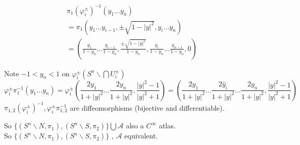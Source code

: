 \begin{enumerate}
\[
\begin{gathered}
\pi_1(\varphi_i^{\pm})^{-1}(y_1 \dots y_n) \\
  = \pi_1(y_1 \dots y_{i-1}, \pm \sqrt{ 1 - |y|^2 }, y_i \dots y_n) \\
  = \left( \frac{y_1 }{ 1 - y_n} \dots \frac{y_{i-1} }{ 1 - y_n}, \frac{ \pm \sqrt{ 1 - |y|^2 } }{ 1 - y_n } , \frac{y_i}{ 1 - y_n} \dots \frac{y_{n-1}}{ 1 - y_n }, 0 \right)
\end{gathered}
\]

Note $-1< y_n <1$ on $\varphi_i^{\pm}(S^n\backslash \bigcap U_i^{\pm})$
\[
\varphi_i^{\pm} \pi_1^{-1}(y_1 \dots y_n) = \varphi_i^{\pm}\left( \frac{ 2y_1}{ 1 + |y|^2} \dots \frac{2y_n}{ 1 + |y|^2} , \frac{|y|^2 - 1 }{ |y|^2 + 1 } \right) = \left( \frac{2y_1 }{ 1 + |y|^2} \dots \frac{ 2 \widehat{y}_i }{ 1 + |y|^2 } \dots \frac{ 2y_n }{ 1 + |y|^2 }, \frac{|y|^2 -1}{ |y|^2 + 1 } \right)
\]
$\pi_{1,2}(\varphi_i^{\pm})^{-1}, \varphi_i^{\pm}\pi_{1,2}^{-1}$ are diffeomorphisms (bijective and differentiable).  

So $\lbrace(S^n\backslash N, \pi_1), (S^n\backslash S , \pi_2) \rbrace \bigcup \mathcal{A}$ also a $C^{\infty}$ atlas.  \\
So $\lbrace(S^n\backslash N, \pi_1), (S^n\backslash S , \pi_2) \rbrace$ ,  $\mathcal{A}$ equivalent.  



\end{enumerate}
